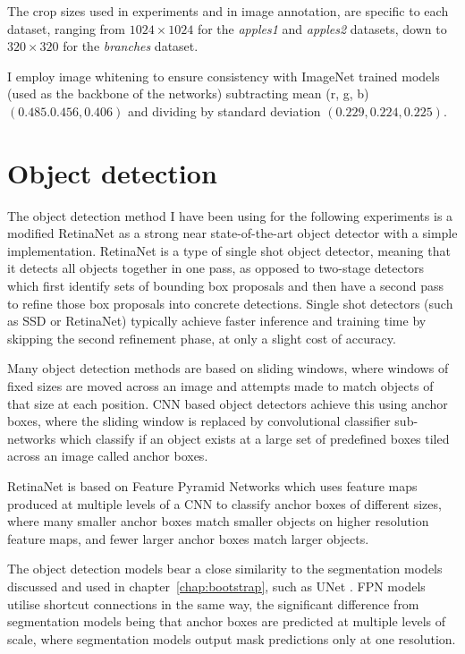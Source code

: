 The crop sizes used in experiments and in image annotation, are specific to each dataset, ranging from $1024\times1024$ for the \emph{apples1} and \emph{apples2} datasets, down to $320\times320$ for the \emph{branches} dataset.

I employ image whitening to ensure consistency with ImageNet trained models (used as the backbone of the networks) subtracting mean (r, g, b) $ (0.485. 0.456, 0.406) $ and dividing by standard deviation $ (0.229, 0.224, 0.225) $.


\section {Object detection}

The object detection method I have been using for the following experiments is a modified RetinaNet \cite{Lin2017} as a strong near state-of-the-art object detector with a simple implementation. RetinaNet is a type of single shot object detector, meaning that it detects all objects together in one pass, as opposed to two-stage detectors which first identify sets of bounding box proposals and then have a second pass to refine those box proposals into concrete detections. Single shot detectors (such as \gls{SSD} \cite{Liu2016a} or RetinaNet) typically achieve faster inference and training time by skipping the second refinement phase, at only a slight cost of accuracy.  

Many object detection methods are based on sliding windows, where windows of fixed sizes are moved across an image and attempts made to match objects of that size at each position. \gls{CNN} based object detectors achieve this using anchor boxes, where the sliding window is replaced by convolutional classifier sub-networks which classify if an object exists at a large set of predefined boxes tiled across an image called anchor boxes. 

RetinaNet is based on Feature Pyramid Networks \cite{Lin2017a} which uses feature maps produced at multiple levels of a \gls{CNN} to classify anchor boxes of different sizes, where many smaller anchor boxes match smaller objects on higher resolution feature maps, and fewer larger anchor boxes match larger objects. 

The object detection models bear a close similarity to the segmentation models discussed and used in chapter~\ref{chap:bootstrap}, such as UNet \cite{Ronneberger2015}. \gls{FPN} models utilise shortcut connections in the same way, the significant difference from segmentation models being that anchor boxes are predicted at multiple levels of scale, where segmentation models output mask predictions only at one resolution.

